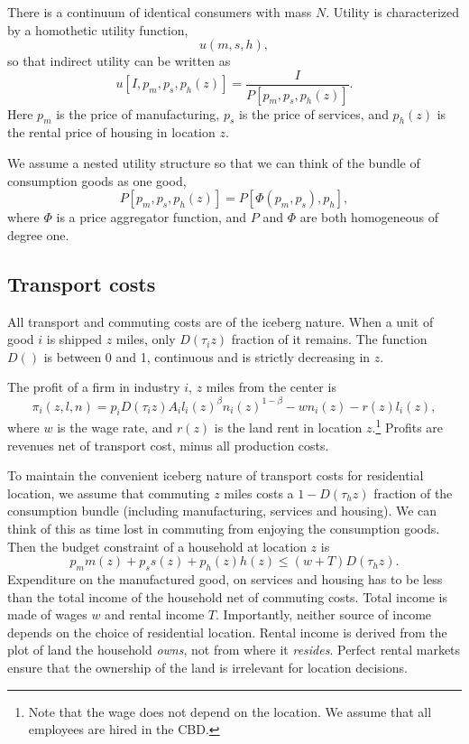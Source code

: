\documentclass[12pt]{article}
\begin{document}
There is a continuum of identical consumers with mass $N$. Utility is characterized by a homothetic utility function,
\[
u(m,s,h),
\]
so that indirect utility can be written as
\[
u[I, p_m,p_s,p_h(z)] = \frac{I}{P[p_m,p_s,p_h(z)]}.
\]
Here $p_m$ is the price of manufacturing, $p_s$ is the price of services, and $p_h(z)$ is the rental price of housing in location $z$.

We assume a nested utility structure so that we can think of the bundle of consumption goods as one good,
    \[
P[p_m,p_s,p_h(z)] = P[\Phi(p_m,p_s),p_h],
    \]
where $\Phi$ is a price aggregator function, and $P$ and $\Phi$ are both homogeneous of degree one.

\subsection{Transport costs}
All transport and commuting costs are of the iceberg nature. When a unit of good $i$ is shipped $z$ miles, only $D(\tau_i z)$ fraction of it remains. The function $D()$ is between 0 and 1, continuous and is strictly decreasing in $z$.

The profit of a firm in industry $i$, $z$ miles from the center is
\[
\pi_i(z,l,n) = p_iD(\tau_i z)A_il_i(z)^\beta n_i(z)^{1-\beta} - wn_i(z) - r(z)l_i(z),
\]
where $w$ is the wage rate, and $r(z)$ is the land rent in location $z$.\footnote{Note that the wage does not depend on the location. We assume that all employees are hired in the CBD.} Profits are revenues net of transport cost, minus all production costs.

To maintain the convenient iceberg nature of transport costs for residential location, we assume that commuting $z$ miles costs a $1-D(\tau_h z)$ fraction of the consumption bundle (including manufacturing, services and housing). We can think of this as time lost in commuting from enjoying the consumption goods. Then the budget constraint of a household at location $z$ is
\[
p_m m(z) + p_s s(z) + p_h(z) h(z) \le (w+T)D(\tau_h z).
\]
Expenditure on the manufactured good, on services and housing has to be less than the total income of the household net of commuting costs. Total income is made of wages $w$ and rental income $T$. Importantly, neither source of income depends on the choice of residential location. Rental income is derived from the plot of land the household \emph{owns}, not from where it \emph{resides}. Perfect rental markets ensure that the ownership of the land is irrelevant for location decisions.
\end{document}
